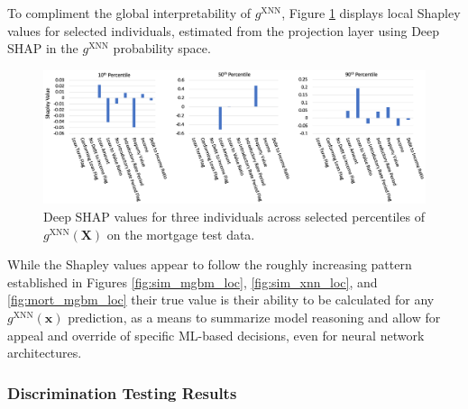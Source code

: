 \documentclass[information,article,submit,moreauthors,pdftex]{definitions/mdpi}
\begin{document}
To compliment the global interpretability of $g^\text{XNN}$, Figure \ref{fig:mort_xnn_loc} displays local Shapley values for selected individuals, estimated from the projection layer using Deep SHAP in the $g^\text{XNN}$ probability space. 

\begin{figure}[H]
\centering
\includegraphics[width=15cm]{img/mort_xnn_loc.png}
\caption{Deep SHAP values for three individuals across selected percentiles of $g^\text{XNN}(\mathbf{X})$ on the mortgage test data.}
\label{fig:mort_xnn_loc}
\end{figure}

\noindent While the Shapley values appear to follow the roughly increasing pattern established in Figures \ref{fig:sim_mgbm_loc}, \ref{fig:sim_xnn_loc}, and \ref{fig:mort_mgbm_loc} their true value is their ability to be calculated for any $g^\text{XNN}(\mathbf{x})$ prediction, as a means to summarize model reasoning and allow for appeal and override of specific ML-based decisions, even for neural network architectures. 

\subsubsection{Discrimination Testing Results}\label{ssec:dis_mort}
\end{document}
